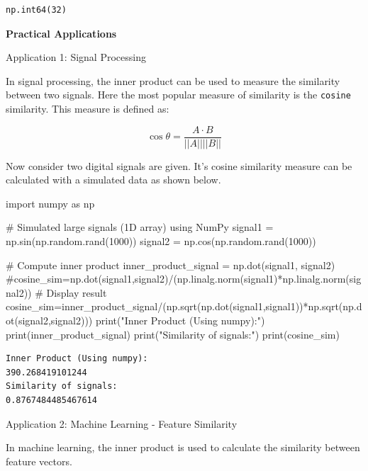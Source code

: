\documentclass[
  letterpaper,
  DIV=11,
  numbers=noendperiod]{scrreprt}
\newenvironment{Shaded}{\begin{snugshade}}{\end{snugshade}}
\newcommand{\BuiltInTok}[1]{\textcolor[rgb]{0.00,0.23,0.31}{#1}}
\newcommand{\CommentTok}[1]{\textcolor[rgb]{0.37,0.37,0.37}{#1}}
\newcommand{\DecValTok}[1]{\textcolor[rgb]{0.68,0.00,0.00}{#1}}
\newcommand{\ImportTok}[1]{\textcolor[rgb]{0.00,0.46,0.62}{#1}}
\newcommand{\NormalTok}[1]{\textcolor[rgb]{0.00,0.23,0.31}{#1}}
\newcommand{\OperatorTok}[1]{\textcolor[rgb]{0.37,0.37,0.37}{#1}}
\newcommand{\StringTok}[1]{\textcolor[rgb]{0.13,0.47,0.30}{#1}}
\theoremstyle{plain}
\theoremstyle{definition}
\theoremstyle{remark}
\begin{document}
\begin{verbatim}
np.int64(32)
\end{verbatim}

\textbf{Practical Applications}

Application 1: Signal Processing

In signal processing, the inner product can be used to measure the
similarity between two signals. Here the most popular measure of
similarity is the \texttt{cosine} similarity. This measure is defined
as:

\[\cos \theta=\dfrac{A\cdot B}{||A|| ||B||}\]

Now consider two digital signals are given. It's cosine similarity
measure can be calculated with a simulated data as shown below.

\begin{Shaded}
\begin{Highlighting}[]
\ImportTok{import}\NormalTok{ numpy }\ImportTok{as}\NormalTok{ np}

\CommentTok{\# Simulated large signals (1D array) using NumPy}
\NormalTok{signal1 }\OperatorTok{=}\NormalTok{ np.sin(np.random.rand(}\DecValTok{1000}\NormalTok{))}
\NormalTok{signal2 }\OperatorTok{=}\NormalTok{ np.cos(np.random.rand(}\DecValTok{1000}\NormalTok{))}

\CommentTok{\# Compute inner product}
\NormalTok{inner\_product\_signal }\OperatorTok{=}\NormalTok{ np.dot(signal1, signal2)}
\CommentTok{\#cosine\_sim=np.dot(signal1,signal2)/(np.linalg.norm(signal1)*np.linalg.norm(signal2))}
\CommentTok{\# Display result}
\NormalTok{cosine\_sim}\OperatorTok{=}\NormalTok{inner\_product\_signal}\OperatorTok{/}\NormalTok{(np.sqrt(np.dot(signal1,signal1))}\OperatorTok{*}\NormalTok{np.sqrt(np.dot(signal2,signal2)))}
\BuiltInTok{print}\NormalTok{(}\StringTok{"Inner Product (Using numpy):"}\NormalTok{)}
\BuiltInTok{print}\NormalTok{(inner\_product\_signal)}
\BuiltInTok{print}\NormalTok{(}\StringTok{"Similarity of signals:"}\NormalTok{)}
\BuiltInTok{print}\NormalTok{(cosine\_sim)}
\end{Highlighting}
\end{Shaded}

\begin{verbatim}
Inner Product (Using numpy):
390.268419101244
Similarity of signals:
0.8767484485467614
\end{verbatim}

Application 2: Machine Learning - Feature Similarity

In machine learning, the inner product is used to calculate the
similarity between feature vectors.
\end{document}
